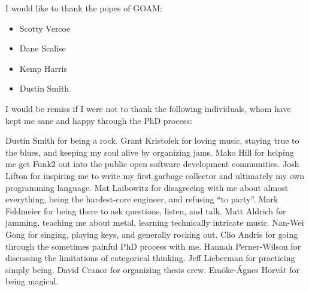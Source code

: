 \vspace{5mm}

I would like to thank the popes of GOAM:
\begin{itemize}
\item{Scotty Vercoe}
\item{Dane Scalise}
\item{Kemp Harris}
\item{Dustin Smith}
\end{itemize}

\vspace{5mm}

I would be remiss if I were not to thank the following individuals,
whom have kept me sane and happy through the PhD process:

Dustin Smith for being a rock.
Grant Kristofek for loving music, staying true to the blues, and keeping my soul alive by organizing jams.
Mako Hill for helping me get Funk2 out into the public open software development communities.
Josh Lifton for inspiring me to write my first garbage collector and ultimately my own programming language.
Mat Laibowitz for disagreeing with me about almost everything, being the hardest-core engineer, and refusing ``to party''.
Mark Feldmeier for being there to ask questions, listen, and talk.
Matt Aldrich for jamming, teaching me about metal, learning technically intricate music.
Nan-Wei Gong for singing, playing keys, and generally rocking out.
Clio Andris for going through the sometimes painful PhD process with me.
Hannah Perner-Wilson for discussing the limitations of categorical thinking.
Jeff Lieberman for practicing simply being.
David Cranor for organizing thesis crew.
Em\"{o}ke-\'{A}gnes Horv\'{a}t for being magical.

\endgroup

